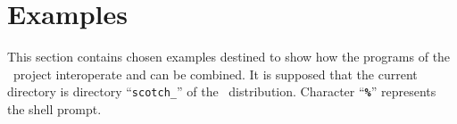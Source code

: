 
\section{Examples}
\label{sec-examples}

This section contains chosen examples destined to show how the programs
of the \scotch\ project interoperate and can be combined.
It is supposed that the current directory is directory
``{\tt scotch\_\scotchver}'' of the \scotch\ distribution.
Character ``{\tt\bf \%}'' represents the shell prompt.
